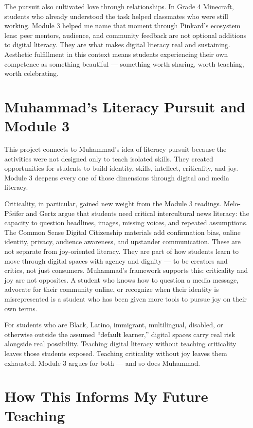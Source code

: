 \documentclass[12pt]{article}
\begin{document}
The pursuit also cultivated love through relationships. In Grade 4 Minecraft, students who already understood the task helped classmates who were still working. Module 3 helped me name that moment through Pinkard's ecosystem lens: peer mentors, audience, and community feedback are not optional additions to digital literacy. They are what makes digital literacy real and sustaining. Aesthetic fulfillment in this context means students experiencing their own competence as something beautiful --- something worth sharing, worth teaching, worth celebrating.

\section*{Muhammad's Literacy Pursuit and Module 3}

This project connects to Muhammad's idea of literacy pursuit because the activities were not designed only to teach isolated skills. They created opportunities for students to build identity, skills, intellect, criticality, and joy. Module 3 deepens every one of those dimensions through digital and media literacy.

Criticality, in particular, gained new weight from the Module 3 readings. Melo-Pfeifer and Gertz argue that students need critical intercultural news literacy: the capacity to question headlines, images, missing voices, and repeated assumptions. The Common Sense Digital Citizenship materials add confirmation bias, online identity, privacy, audience awareness, and upstander communication. These are not separate from joy-oriented literacy. They are part of how students learn to move through digital spaces with agency and dignity --- to be creators and critics, not just consumers. Muhammad's framework supports this: criticality and joy are not opposites. A student who knows how to question a media message, advocate for their community online, or recognize when their identity is misrepresented is a student who has been given more tools to pursue joy on their own terms.

For students who are Black, Latino, immigrant, multilingual, disabled, or otherwise outside the assumed ``default learner,'' digital spaces carry real risk alongside real possibility. Teaching digital literacy without teaching criticality leaves those students exposed. Teaching criticality without joy leaves them exhausted. Module 3 argues for both --- and so does Muhammad.

\section*{How This Informs My Future Teaching}
\end{document}
